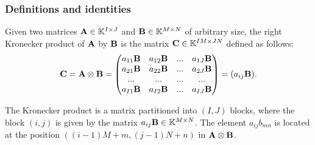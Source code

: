 \subsubsection{Definitions and identities}
\begin{definition}{}{}
    Given two matrices $\bold{A}\in\mathbb{K}^{I\times J}$ and $\bold{B}\in \mathbb{K}^{M\times N}$
    of arbitrary size, the right Kronecker product of $\bold{A}$ by $\bold{B}$ is the matrix $\bold{C}\in \mathbb{K}^{IM\times JN}$
    defined as follows:
    \begin{align*}
        \bold{C}=\bold{A}\otimes \bold{B}=\begin{pmatrix}
            a_{11}\bold{B} & a_{12}\bold{B} & ...& a_{1J}\bold{B}\\
            a_{21} \bold{B} & a_{22}\bold{B} & ... & a_{2J}\bold{B}\\
            ...&...&...&...\\
            a_{I1}\bold{B}&a_{I2}\bold{B}&...&a_{IJ}\bold{B}
        \end{pmatrix}=(a_{ij}\bold{B}).
    \end{align*}
\end{definition}
\begin{remark}
    The Kronecker product is a matrix partitioned into $(I,J)$ blocks, where the block $(i,j)$ is given by the matrix $a_{ij}\bold{B}\in \mathbb{K}^{M\times N}$.
    The element $a_{ij}b_{mn}$ is located at the position $((i-1)M+m,(j-1)N+n)$ in $\bold{A}\otimes \bold{B}$.
\end{remark}

            


